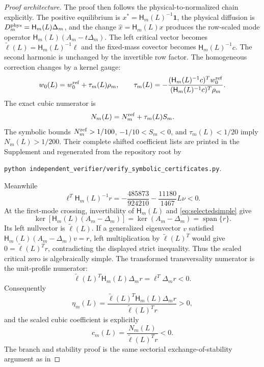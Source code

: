 \documentclass[11pt]{article}
\newif\ifsiadsreview
\theoremstyle{definition}
\newcommand{\1}{\mathbf 1}
\begin{document}
\begin{proof}[Proof architecture]
The proof then follows the physical-to-normalized chain explicitly.  The
positive equilibrium is $x^*=\mathsf H_m(L)^{-1}\1$, the physical diffusion is
$D_m^{\rm phys}=\mathsf H_m(L)\Delta_m$, and the change
$\widehat x=\mathsf H_m(L)x$
produces the row-scaled mode operator $\mathsf H_m(L)(A_m-t\Delta_m)$.
The left critical vector becomes
$\widetilde\ell(L)=\mathsf H_m(L)^{-1}\ell$ and the fixed-mass covector
becomes $\mathsf H_m(L)^{-1}c$.  The second harmonic is
unchanged by the invertible row factor.  The homogeneous correction changes
by a kernel gauge:
\begin{equation}\label{eq:gauge}
 w_0(L)=w_0^{\rm ref}+\tau_m(L)\rho_m,
 \qquad
 \tau_m(L)=-\frac{(\mathsf H_m(L)^{-1}c)^Tw_0^{\rm ref}}
 {(\mathsf H_m(L)^{-1}c)^T\rho_m}.
\end{equation}
The exact cubic numerator is
\begin{equation}\label{eq:NL}
 N_m(L)=N_m^{\rm ref}+\tau_m(L)S_m.
\end{equation}
The symbolic bounds
$N_m^{\rm ref}>1/100$, $-1/10<S_m<0$, and $\tau_m(L)<1/20$ imply
$N_m(L)>1/200$.  Their complete shifted coefficient lists are printed in the
Supplement and regenerated from the repository root by
\ifsiadsreview
the command
\begin{center}
\texttt{python independent\_verifier/}\\[-0.2em]
\texttt{verify\_symbolic\_certificates.py}.
\end{center}
\else
\texttt{python independent\_verifier/verify\_symbolic\_certificates.py}.
\fi
Meanwhile
\[
 \ell^T\mathsf H_m(L)^{-1}r
 =-\frac{485873}{924210}-\frac{11180}{1467}L\nu<0.
\]
At the first-mode crossing, invertibility of $\mathsf H_m(L)$ and
\eqref{eq:selectedsimple} give
\[
 \ker\!\left[\mathsf H_m(L)(A_m-\Delta_m)\right]
 =\ker(A_m-\Delta_m)=\operatorname{span}\{r\}.
\]
Its left nullvector is $\widetilde\ell(L)$.  If a generalized eigenvector
$v$ satisfied
$\mathsf H_m(L)(A_m-\Delta_m)v=r$, left multiplication by
$\widetilde\ell(L)^T$ would give
$0=\widetilde\ell(L)^Tr$, contradicting the displayed strict inequality.
Thus the scaled critical zero is algebraically simple.
The transformed transversality numerator is the unit-profile numerator:
\[
 \widetilde\ell(L)^T\mathsf H_m(L)\Delta_m r
 =\ell^T\Delta_m r<0.
\]
Consequently
\[
 \eta_m(L)=
 \frac{\widetilde\ell(L)^T\mathsf H_m(L)\Delta_m r}
 {\widetilde\ell(L)^Tr}>0,
\]
and the scaled cubic coefficient is explicitly
\[
 c_m(L)=\frac{N_m(L)}{\widetilde\ell(L)^Tr}<0.
\]
The branch and stability proof is the
same sectorial exchange-of-stability argument as in

\end{proof}
\end{document}
